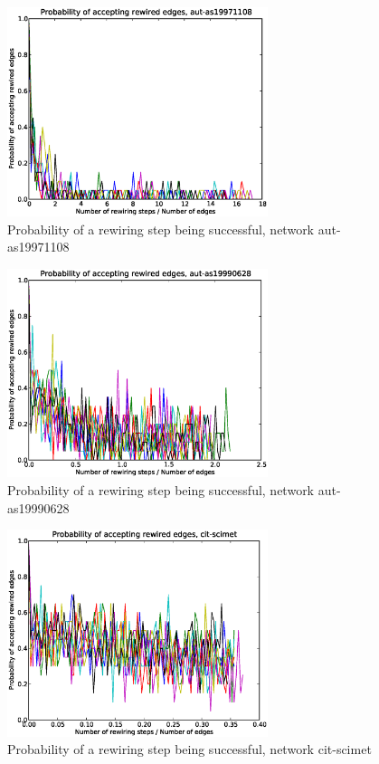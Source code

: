 \begin{figure}[p]
\centering
\includegraphics[width=3in]{Figures/Paccept-aut-as19971108.eps}
\caption{Probability of a rewiring step being successful, network aut-as19971108}
\label{fig:Paccept-aut-as19971108}
\end{figure}

\begin{figure}[p]
\centering
\includegraphics[width=3in]{Figures/Paccept-aut-as19990628.eps}
\caption{Probability of a rewiring step being successful, network aut-as19990628}
\label{fig:Paccept-aut-as19990628}
\end{figure}

\begin{figure}[p]
\centering
\includegraphics[width=3in]{Figures/Paccept-cit-scimet.eps}
\caption{Probability of a rewiring step being successful, network cit-scimet}
\label{fig:Paccept-cit-scimet}
\end{figure}

